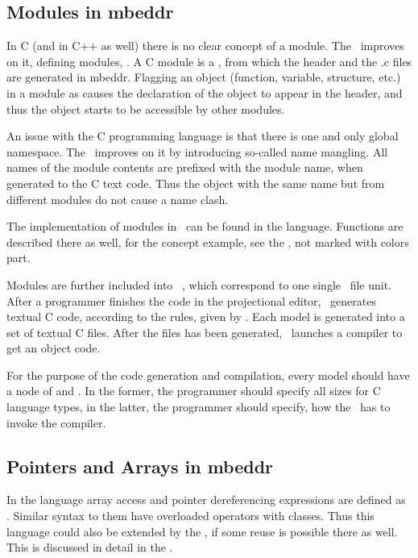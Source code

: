 \subsection{Modules in mbeddr}
\label{mbdrmodules}

In C (and in C++ as well) there is no clear concept of a module. The \mbp\ improves on it, defining 
modules, \cite{Voelter:MoDELS:2010}. A C module is a , from which the header and the .c files are generated in mbeddr.
Flagging an object (function, variable, structure, etc.) in a module as  causes the declaration of the object to appear
in the header, and thus the object starts to be accessible by other modules.

An issue with the C programming language is that there is one and only global namespace. The \mbp\ improves on it 
by introducing so-called name mangling. All names of the module contents are prefixed with the module name,
when generated to the C text code. Thus the object with the same name but from different modules do
not cause a name clash.

The implementation of modules in \mbdr\ can be found in the  language. Functions are described there as well,
for the  concept example, see the , not marked with colors part.

Modules are further included into \jbmps\ , which correspond to one single \jbmps\ file unit.
After a programmer finishes the code in the projectional editor, \jbmps\ generates textual C code, 
according to the rules, given by \mbdr. Each model is generated into a set of textual C files.
After the files has been generated, \mbdr\ launches a compiler to get an object code.

For the purpose of the code generation and compilation, every model should have a node of  
and  . In the former, the programmer should specify all sizes for C language types, 
in the latter, the programmer should specify, how the \mbdr\ has to invoke the compiler.

\subsection{Pointers and Arrays in mbeddr}

In the  language array access and pointer dereferencing expressions are defined as .
Similar syntax to them have overloaded operators with classes. Thus this language could also be extended by the \pcpp,
if some reuse is possible there as well. This is discussed in detail in the .








